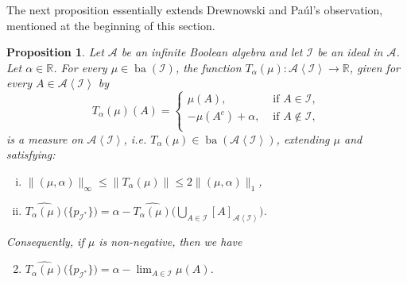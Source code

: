 \documentclass[a4paper,11pt,fleqn]{amsart}
\newtheorem{proposition}[theorem]{Proposition}
\theoremstyle{definition}
\theoremstyle{remark}
\numberwithin{equation}{section}
\newcommand{\R}{\mathbb{R}}
\newcommand{\aA}{\mathcal{A}}
\newcommand{\iI}{\mathcal{I}}
\DeclareMathOperator{\ba}{ba}
\newcommand{\wh}{\widehat}
\newcommand{\gen}[1]{\mathopen{}\left\langle#1\mathclose{}\right\rangle}
\newcommand{\clopen}[1]{\left[#1\right]}
\begin{document}
The next proposition essentially extends Drewnowski and Pa\'{u}l's observation, mentioned at the beginning of this section.

\begin{proposition}\label{prop:extension_on_alg}
    Let $\aA$ be an infinite Boolean algebra and let $\iI$ be an ideal in $\aA$. Let $\alpha\in\R$. For every $\mu\in\ba(\iI)$, the function $T_\alpha(\mu)\colon\aA\gen{\iI}\to\R$, given for every $A\in\aA\gen{\iI}$ by
    \[T_\alpha(\mu)(A)=\begin{cases}
        \mu(A),&\text{ if }A\in\iI,\\
        -\mu(A^c)+\alpha,&\text{ if }A\not\in\iI,\\
    \end{cases}\]
    is a measure on $\aA\gen{\iI}$, i.e. $T_\alpha(\mu)\in\ba(\aA\gen{\iI})$, extending $\mu$ and satisfying:
    \begin{enumerate}[(i),itemsep=2mm]
        \item $\|(\mu,\alpha)\|_\infty\le\big\|T_\alpha(\mu)\big\|\le2\|(\mu,\alpha)\|_1$,
        \item $\wh{T_\alpha(\mu)}\big(\big\{p_{\iI^*}\big\}\big)=\alpha-\wh{T_\alpha(\mu)}\Big(\bigcup_{A\in\iI}\clopen{A}_{\aA\gen{\iI}}\Big)$.
    \end{enumerate}

    \noindent Consequently, if $\mu$ is non-negative, then we have
    \begin{enumerate}[(i'),itemsep=2mm]\setcounter{enumi}{1}
        \item $\wh{T_\alpha(\mu)}\big(\big\{p_{\iI^*}\big\}\big)=\alpha-\lim_{A\in\iI}\mu(A)$.
    \end{enumerate}
\end{proposition}
\end{document}
